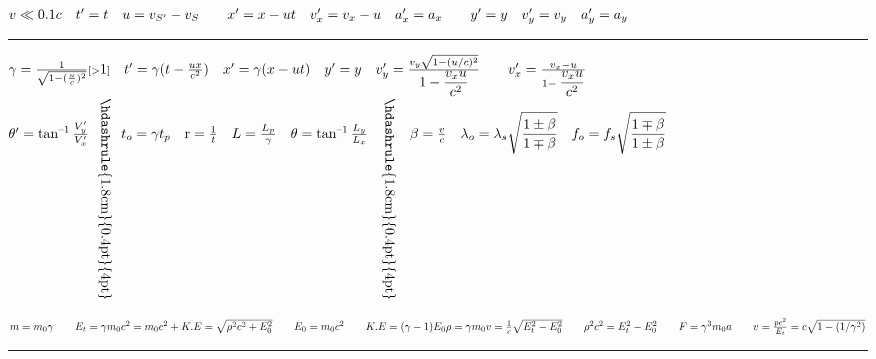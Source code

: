 \documentclass[a4paper,12pt]{article}
\newcommand{\sz}{\text{--}}
\begin{document}

\fontsize{12}{14}\selectfont

\noindent
$
    v \ll 0.1c \quad t^\prime = t \quad u = v_{S^\prime} - v_S \qquad x^\prime = x - ut \quad v^\prime_x = v_x - u \quad a_x^\prime = a_x \qquad y^\prime = y \quad v^\prime_y = v_y \quad a_y^\prime = a_y\\[-8mm]
$

{\centering \rule{18cm}{0.4pt} \par}

\noindent
$
    \gamma = \frac{1}{\sqrt{1- (\frac{u}{c})^2}} {\scriptstyle [>}1{\scriptstyle]} \quad t^\prime = \gamma (t - \frac{ux}{c^2}) \quad x^\prime = \gamma(x - ut) \quad  y^\prime = y \quad v^\prime_y = \frac{v_y \sqrt{1-(u/c)^2}}{\displaystyle 1- \frac{v_x u}{c^2}} \qquad v_x^\prime = \frac{v_x - u}{1- \displaystyle \frac{v_xu}{c^2}} \\[-5mm]
$

{\hspace*{19.5mm}\hdashrule{16cm}{0.4pt}{4pt} \par}

\noindent
$
    \theta^\prime = \tan^{\sz 1}{\frac{V_y^\prime}{V_x^\prime}} ~~ \rotatebox{-90}{\hskip-1cm\hdashrule{1.8cm}{0.4pt}{4pt}} ~~ t_o = \gamma t_p \quad \text{r} = \frac{1}{t} \quad L = \frac{L_p}{\gamma} \quad \theta = \tan^{\sz1}{\frac{L_y}{L_x}} \quad \rotatebox{-90}{\hskip-1cm\hdashrule{1.8cm}{0.4pt}{4pt}} \quad
    \beta = \frac{v}{c} \quad \lambda_o = \lambda_s \displaystyle \sqrt{\frac{1\pm \beta}{1\mp \beta}} \quad f_o = f_s \displaystyle \sqrt{\frac{1\mp \beta}{1\pm \beta}}\\[-.8cm]
$

{\centering \hdashrule{18cm}{0.4pt}{4pt} \par}

\noindent
$ m = m_0 \gamma \qquad E_t = \gamma m_0c^2 = m_0c^2 + K.E = \sqrt{\rho^2 c^2 + E_0^2} \qquad E_0 = m_0 c^2 \qquad K.E = (\gamma - 1) E_0 \\
    \rho = \gamma m_0v = \frac{1}{c} \sqrt{E_t^2 - E_0^2} \qquad \rho^2c^2 = E_t^2 - E_0^2 \qquad F = \gamma^3 m_0 a \qquad v = \frac{p c^2}{E_t} = c \sqrt{1- (1/\gamma^2)} $\\[-6mm]

{\centering \rule{18cm}{0.4pt} \par}
\end{document}

